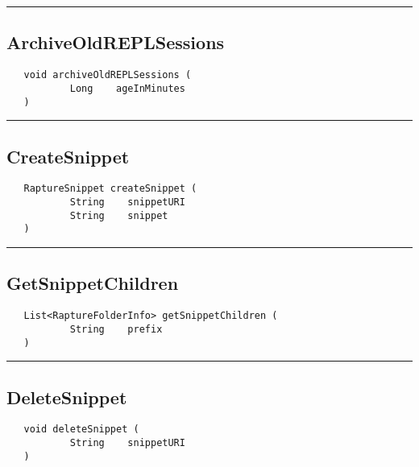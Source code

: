 \rule{15cm}{2pt}
\subsection{ArchiveOldREPLSessions}
\label{Api:ArchiveOldREPLSessions}
\begin{verbatim}
   void archiveOldREPLSessions (
           Long    ageInMinutes
   )
\end{verbatim}



\rule{15cm}{2pt}
\subsection{CreateSnippet}
\label{Api:CreateSnippet}
\begin{verbatim}
   RaptureSnippet createSnippet (
           String    snippetURI
           String    snippet
   )
\end{verbatim}



\rule{15cm}{2pt}
\subsection{GetSnippetChildren}
\label{Api:GetSnippetChildren}
\begin{verbatim}
   List<RaptureFolderInfo> getSnippetChildren (
           String    prefix
   )
\end{verbatim}



\rule{15cm}{2pt}
\subsection{DeleteSnippet}
\label{Api:DeleteSnippet}
\begin{verbatim}
   void deleteSnippet (
           String    snippetURI
   )
\end{verbatim}



